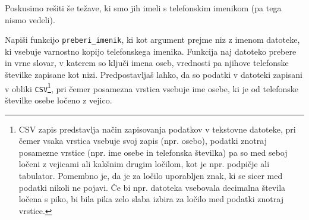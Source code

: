 Poskusimo rešiti še težave, ki smo jih imeli s telefonskim imenikom (pa tega nismo vedeli).
\begin{zgled}
Napiši funkcijo \texttt{preberi\_imenik}, ki kot argument prejme niz z imenom datoteke, ki vsebuje varnostno kopijo telefonskega imenika. Funkcija naj datoteko prebere in vrne slovar, v katerem so ključi imena oseb, vrednosti pa njihove telefonske številke zapisane kot nizi. Predpostavljaš lahko, da so podatki v datoteki zapisani v obliki \texttt{CSV}\footnote{CSV zapis  predstavlja način zapisovanja podatkov v tekstovne datoteke, pri čemer vsaka vrstica vsebuje svoj zapis (npr. osebo), podatki znotraj posamezne vrstice (npr. ime osebe in telefonska številka) pa so med seboj ločeni z vejicami ali kakšnim drugim ločilom, kot je npr. podpičje ali tabulator. Pomembno je, da je za ločilo uporabljen znak, ki se sicer med podatki nikoli ne pojavi. Če bi npr. datoteka vsebovala decimalna števila ločena s piko, bi bila pika zelo slaba izbira za ločilo med podatki znotraj vrstice.}, pri čemer posamezna vrstica vsebuje ime osebe, ki je od telefonske številke osebe ločeno z vejico.
\end{zgled}
